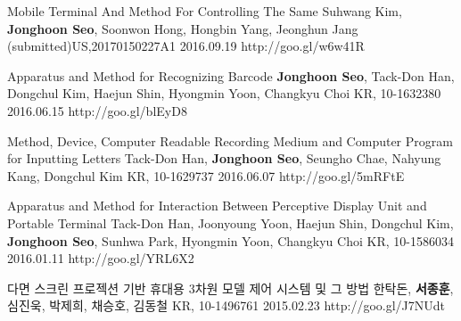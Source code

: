 
\begin{cventries}
  \cvpatententry
    {Mobile Terminal And Method For Controlling The Same} %
    {Suhwang Kim, \textbf{Jonghoon Seo}, Soonwon Hong, Hongbin Yang, Jeonghun Jang} %
    {(submitted)US,20170150227A1} %
    {2016.09.19} %
    {http://goo.gl/w6w41R}

  \cvpatententry
    {Apparatus and Method for Recognizing Barcode} %
    {\textbf{Jonghoon Seo}, Tack-Don Han, Dongchul Kim, Haejun Shin, Hyongmin Yoon, Changkyu Choi} %
    {KR, 10-1632380} %
    {2016.06.15} %
    {http://goo.gl/blEyD8}

  \cvpatententry
    {Method, Device, Computer Readable Recording Medium and Computer Program for Inputting Letters} %
    {Tack-Don Han, \textbf{Jonghoon Seo}, Seungho Chae, Nahyung Kang, Dongchul Kim} %
    {KR, 10-1629737} %
    {2016.06.07} %
    {http://goo.gl/5mRFtE}

  \cvpatententry
    {Apparatus and Method for Interaction Between Perceptive Display Unit and Portable Terminal} %
    {Tack-Don Han, Joonyoung Yoon, Haejun Shin, Dongchul Kim, \textbf{Jonghoon Seo}, Sunhwa Park, Hyongmin Yoon, Changkyu Choi} %
    {KR, 10-1586034} %
    {2016.01.11} %
    {http://goo.gl/YRL6X2}

  \cvpatententry
    {다면 스크린 프로젝션 기반 휴대용 3차원 모델 제어 시스템 및 그 방법} %
    {한탁돈, \textbf{서종훈}, 심진욱, 박제희, 채승호, 김동철} %
    {KR, 10-1496761} %
    {2015.02.23} %
    {http://goo.gl/J7NUdt}


\end{cventries}
